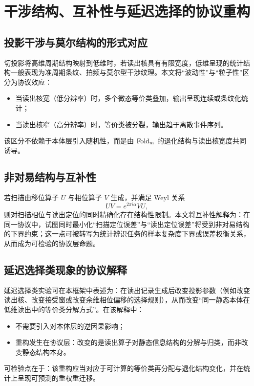 \section{干涉结构、互补性与延迟选择的协议重构}

\subsection{投影干涉与莫尔结构的形式对应}

切投影将高维周期结构映射到低维时，若读出核具有有限宽度，低维呈现的统计结构一般表现为准周期条纹、拍频与莫尔型干涉纹理。本文将“波动性”与“粒子性”区分为协议效应：
\begin{itemize}
  \item 当读出核宽（低分辨率）时，多个微态等价类叠加，输出呈现连续或条纹化统计；
  \item 当读出核窄（高分辨率）时，等价类被分裂，输出趋于离散事件序列。
\end{itemize}
该区分不依赖于本体层引入随机性，而是由 $\mathrm{Fold}_m$ 的退化结构与读出核宽度共同诱导。

\subsection{非对易结构与互补性}

若扫描由移位算子 $U$ 与相位算子 $V$ 生成，并满足 Weyl 关系
\[
UV=e^{2\pi i\alpha}VU,
\]
则对扫描相位与读出定位的同时精确化存在结构性限制。本文将互补性解释为：在同一协议中，试图同时最小化“扫描定位误差”与“读出定位误差”将受到非对易结构的下界约束；这一点可被转写为统计辨识任务的样本复杂度下界或误差权衡关系，从而成为可检验的协议层命题。

\subsection{延迟选择类现象的协议解释}

延迟选择类实验可在本框架中表述为：在读出记录生成后改变投影参数（例如改变读出核、改变接受窗或改变余维相位偏移的选择规则），从而改变“同一静态本体在低维读出中的等价类分解方式”。在该解释中：
\begin{itemize}
  \item 不需要引入对本体层的逆因果影响；
  \item 重构发生在协议层：改变的是读出算子对静态信息结构的分解与归类，而非改变静态结构本身。
\end{itemize}
可检验点在于：该重构应当对应于可计算的等价类再分配与退化结构变化，并在统计上呈现可预测的重权重迁移。

